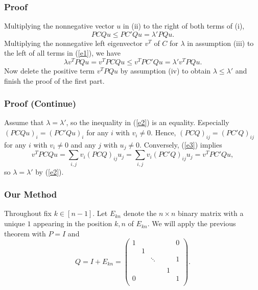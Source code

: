\documentclass[]{beamer}
\theoremstyle{plain}
\theoremstyle{definition}
\begin{document}
\begin{frame}
    \frametitle{ Proof}
            Multiplying the nonnegative vector $u$ in (ii) to the right of both terms of  (i),
        \begin{equation}
            \label{e1}
            PCQu\leq PC'Qu=\lambda'PQu.
        \end{equation}
        Multiplying the nonnegative left eigenvector $v^T$ of $C$ for $\lambda$ in assumption (iii) to the left of all terms  in (\ref{e1}), we have
        \begin{equation}
            \label{e2}
            \lambda v^TPQu=v^TPCQu\leq v^TPC'Qu=\lambda' v^TPQu.
        \end{equation}
        Now delete the positive term $v^TPQu$ by assumption (iv) to obtain $\lambda\leq \lambda'$ and finish the proof of the first part.
\end{frame}

\begin{frame}
    \frametitle{ Proof (Continue)}
        Assume that $\lambda=\lambda'$, so the inequality in (\ref{e2}) is an equality.  Especially $(PCQu)_i=(PC'Qu)_i$ for any $i$ with $v_i\not=0.$ Hence, $(PCQ)_{ij}=(PC'Q)_{ij}$ for any $i$ with $v_i\not=0$ and any $j$ with $u_j\not=0.$ 
         Conversely, (\ref{e3}) implies $$v^TPCQu=\sum_{i,j} v_i(PCQ)_{ij}u_j=\sum_{i,j} v_i(PC'Q)_{ij}u_j=v^TPC'Qu,$$ so
            $\lambda=\lambda'$ by (\ref{e2}).
\end{frame}

\begin{frame}
    \frametitle{ Our Method}


 Throughout fix $k\in [n-1]$. Let $E_{kn}$ denote the $n\times n$ binary matrix with a unique $1$ appearing in the  position $k,n$ of $E_{kn}$. We will apply the previous theorem with $P=I$ and $$Q=I+E_{kn}=\begin{pmatrix}
1 &  & & &  & 0 \\
 & 1 &  &      &  &  \\
 &  & \ddots & &  & 1 \\
 &  &        & &  &  \\
  &  & & & 1 &  \\
0 &  & & &  & 1 \\
\end{pmatrix}.$$

\end{frame}
\end{document}

